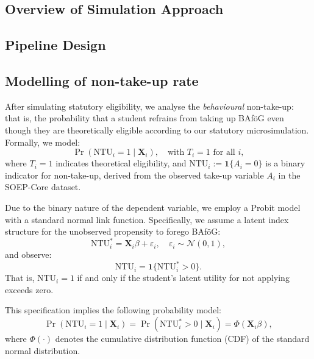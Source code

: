 \subsection{Overview of Simulation Approach}


\subsection{Pipeline Design}


\subsection{Modelling of non-take-up rate}
After simulating statutory eligibility, we analyse the \textit{behavioural} non-take-up: 
that is, the probability that a student refrains from taking up BAföG even though they are theoretically eligible according to our statutory microsimulation. 
Formally, we model:
\begin{equation}
  \Pr(\mathrm{NTU}_i = 1 \mid \mathbf{X}_i), \quad \text{with } T_i = 1 \text{ for all } i,
\end{equation}
where \( T_i = 1 \) indicates theoretical eligibility, and \( \mathrm{NTU}_i := \mathbf{1}\{A_i = 0\} \) is a binary indicator for non-take-up, derived from the observed take-up variable \( A_i \) in the SOEP-Core dataset.

Due to the binary nature of the dependent variable, we employ a Probit model with a standard normal link function. Specifically, we assume a latent index structure for the unobserved propensity to forego BAföG:
\begin{equation}
  \mathrm{NTU}_i^* = \mathbf{X}_i \beta + \varepsilon_i, 
  \quad 
  \varepsilon_i \sim \mathcal{N}(0,1),
\end{equation}
and observe:
\begin{equation}
  \mathrm{NTU}_i = \mathbf{1} \{ \mathrm{NTU}_i^* > 0 \}.
\end{equation}
That is, \( \mathrm{NTU}_i = 1 \) if and only if the student's latent utility for not applying exceeds zero.

This specification implies the following probability model:
\begin{equation}
  \Pr(\mathrm{NTU}_i = 1 \mid \mathbf{X}_i) = \Pr(\mathrm{NTU}_i^* > 0 \mid \mathbf{X}_i) = \Phi(\mathbf{X}_i \beta),
\end{equation}
where \( \Phi(\cdot) \) denotes the cumulative distribution function (CDF) of the standard normal distribution.

